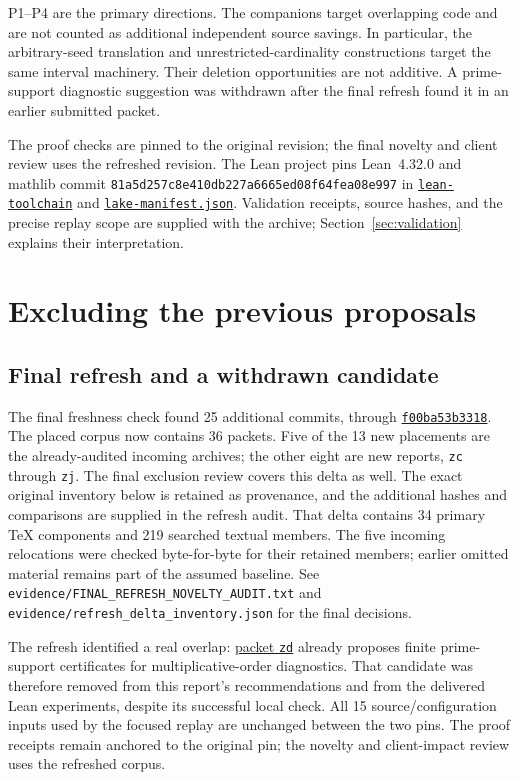 \documentclass[11pt,letterpaper]{article}
\newcommand{\repobase}{https://github.com/VladimirReshetnikov/ProveIt/blob/9f35798db4a63c25e435fca14d75931144657d7e}
\newcommand{\refreshbase}{https://github.com/VladimirReshetnikov/ProveIt/blob/f00ba53b331833c6cb64707bd90e48489e5610f5}
\newcommand{\artifact}[1]{\nolinkurl{#1}}
\begin{document}
P1--P4 are the primary directions. The companions target overlapping code
and are not counted as additional independent source savings. In particular, the arbitrary-seed translation and unrestricted-cardinality
constructions target the same interval machinery. Their deletion opportunities
are not additive. A prime-support diagnostic suggestion was withdrawn after
the final refresh found it in an earlier submitted packet.

The proof checks are pinned to the original revision; the final novelty and
client review uses the refreshed revision. The Lean project pins
Lean~4.32.0 and mathlib commit
\nolinkurl{81a5d257c8e410db227a6665ed08f64fea08e997} in
\href{\repobase/lean-toolchain}{\nolinkurl{lean-toolchain}} and
\href{\repobase/lake-manifest.json}{\nolinkurl{lake-manifest.json}}.
Validation receipts, source hashes, and the precise replay scope are supplied
with the archive; Section~\ref{sec:validation} explains their interpretation.

\section{Excluding the previous proposals}

\subsection{Final refresh and a withdrawn candidate}

The final freshness check found 25 additional commits, through
\href{https://github.com/VladimirReshetnikov/ProveIt/commit/f00ba53b331833c6cb64707bd90e48489e5610f5}{\texttt{f00ba53b3318}}.
The placed corpus now contains 36 packets. Five of the 13 new placements
are the already-audited incoming archives; the other eight are new reports,
\texttt{zc} through \texttt{zj}. The final exclusion review covers this
delta as well. The exact original inventory below is retained as provenance,
and the additional hashes and comparisons are supplied in the refresh audit.
That delta contains 34 primary TeX components and 219 searched textual
members. The five incoming relocations were checked byte-for-byte for their
retained members; earlier omitted material remains part of the assumed
baseline. See \artifact{evidence/FINAL_REFRESH_NOVELTY_AUDIT.txt} and
\artifact{evidence/refresh_delta_inventory.json} for the final decisions.

The refresh identified a real overlap: \href{\refreshbase/Computability/DiophantineConsistency/research/lean-proof-simplification/2026-10-26zd/report.tex}{packet \texttt{zd}} already proposes
finite prime-support certificates for multiplicative-order diagnostics.
That candidate was therefore removed from this report's recommendations and
from the delivered Lean experiments, despite its successful local check.
All 15 source/configuration inputs used by
the focused replay are unchanged between the two pins. The proof receipts
remain anchored to the original pin; the novelty and client-impact review
uses the refreshed corpus.
\end{document}
